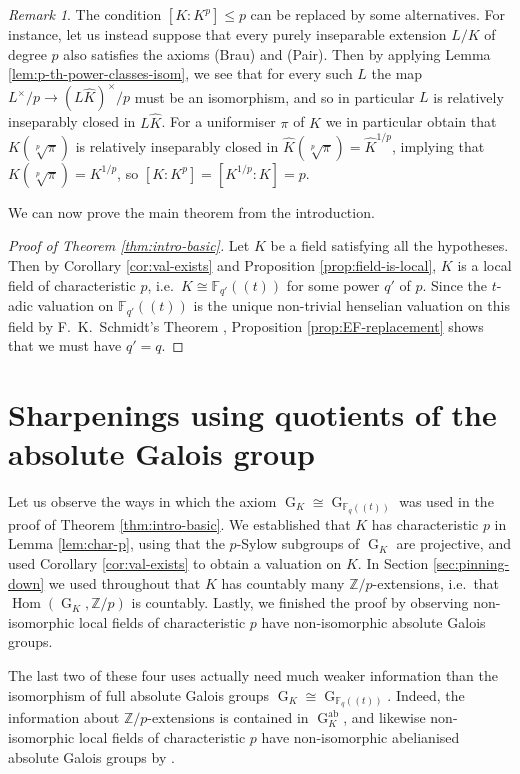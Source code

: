 \documentclass[a4paper, british, oneside]{amsart}
\newcommand{\Z}{\mathbb{Z}}
\newcommand{\F}{\mathbb{F}}
\DeclareMathOperator{\G}{G}
\DeclareMathOperator{\Hom}{Hom}
\newcommand{\pow}[1]{(\!(#1)\!)}
\theoremstyle{definition}
\theoremstyle{remark}
\newtheorem{remark}[theorem]{Remark}
\begin{document}
\begin{remark}\label{rem:alternative-to-imperfection-axiom}
  The condition $[K : K^p] \leq p$ can be replaced by some alternatives.
  For instance, let us instead suppose that every purely inseparable extension $L/K$ of degree $p$ also satisfies the axioms (Brau) and (Pair).
  Then by applying Lemma \ref{lem:p-th-power-classes-isom}, we see that for every such $L$ the map $L^\times/p \to (L\widehat{K})^\times/p$ must be an isomorphism, and so in particular $L$ is relatively inseparably closed in $L\widehat{K}$.
  For a uniformiser $\pi$ of $K$ we in particular obtain that $K(\sqrt[p]{\pi})$ is relatively inseparably closed in $\widehat{K}(\sqrt[p]{\pi}) = \widehat{K}^{1/p}$, implying that $K(\sqrt[p]{\pi}) = K^{1/p}$, so $[K : K^p] = [K^{1/p} : K] = p$.
\end{remark}


We can now prove the main theorem from the introduction.
\begin{proof}[Proof of Theorem \ref{thm:intro-basic}]
  Let $K$ be a field satisfying all the hypotheses.
  Then by Corollary \ref{cor:val-exists} and Proposition \ref{prop:field-is-local}, $K$ is a local field of characteristic $p$, i.e.\ $K \cong \F_{q'}\pow{t}$ for some power $q'$ of $p$.
  Since the $t$-adic valuation on $\F_{q'}\pow{t}$ is the unique non-trivial henselian valuation on this field by F.~K.~Schmidt's Theorem \cite[Theorem 4.4.1]{EnglerPrestel}, Proposition \ref{prop:EF-replacement} shows that we must have $q' = q$.
\end{proof}


\section{Sharpenings using quotients of the absolute Galois group}
\label{sec:sharpenings-quotients}

Let us observe the ways in which the axiom $\G_K \cong \G_{\F_q\pow{t}}$ was used in the proof of Theorem \ref{thm:intro-basic}.
We established that $K$ has characteristic $p$ in Lemma \ref{lem:char-p},
using that the $p$-Sylow subgroups of $\G_K$ are projective,
and used Corollary \ref{cor:val-exists} to obtain a valuation on $K$.
In Section \ref{sec:pinning-down} we used throughout that $K$ has countably many $\Z/p$-extensions,
i.e.\ that $\Hom(\G_K, \Z/p)$ is countably.
Lastly, we finished the proof by observing non-isomorphic local fields of characteristic $p$ have non-isomorphic absolute Galois groups.

The last two of these four uses actually need much weaker information than the isomorphism of full absolute Galois groups $\G_K \cong \G_{\F_q\pow{t}}$.
Indeed, the information about $\Z/p$-extensions is contained in $\G_K^{\mathrm{ab}}$,
and likewise non-isomorphic local fields of characteristic $p$ have non-isomorphic abelianised absolute Galois groups by \cite[Proposition 7.5.9]{NSW}.
\end{document}
